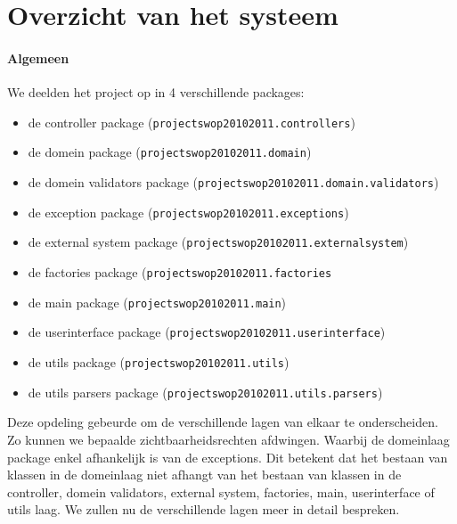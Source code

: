\section{Overzicht van het systeem}
\label{overzicht}
\paragraph{Algemeen}
We deelden het project op in 4 verschillende packages:
\begin{itemize}
  \item de controller package (\texttt{projectswop20102011.controllers})
  \item de domein package (\texttt{projectswop20102011.domain})
  \item de domein validators package (\texttt{projectswop20102011.domain.validators})
  \item de exception package (\texttt{projectswop20102011.exceptions})
  \item de external system package (\texttt{projectswop20102011.externalsystem})
  \item de factories package (\texttt{projectswop20102011.factories}
  \item de main package (\texttt{projectswop20102011.main})
  \item de userinterface package (\texttt{projectswop20102011.userinterface})
  \item de utils package (\texttt{projectswop20102011.utils})
  \item de utils parsers package (\texttt{projectswop20102011.utils.parsers})
\end{itemize}
Deze opdeling gebeurde om de verschillende lagen van elkaar te onderscheiden. Zo kunnen we bepaalde zichtbaarheidsrechten afdwingen. Waarbij de domeinlaag package enkel afhankelijk is van de exceptions.
Dit betekent dat het bestaan van klassen in de domeinlaag niet afhangt van het bestaan van klassen in de controller, domein validators, external system, factories, main, userinterface of utils laag.
We zullen nu de verschillende lagen meer in detail bespreken.
